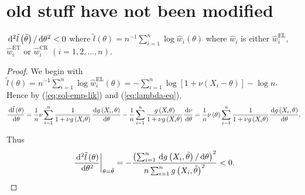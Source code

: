 \section{old stuff have not been modified}
\begin{lem}
\label{lem:bell-shape-el} %
\begin{comment}
need condition 
\end{comment}
$\,\mathrm{d}^{2}\tilde{l}\left(\tilde{\theta}\right)/\,\mathrm{d}\theta^{2}<0$
where $\tilde{l}\left(\theta\right)=n^{-1}\sum_{i=1}^{n}\log\hat{w}_{i}\left(\theta\right)$
where $\hat{w}_{i}$ is either $\hat{w}_{i}^{\mathrm{EL}}$, $\hat{w}_{i}^{\mathrm{ET}}$
or $\hat{w}_{i}^{\mathrm{CR}}$ $\left(i=1,2,\ldots,n\right)$.\end{lem}
\begin{proof}
We begin with $\tilde{l}\left(\theta\right)=n^{-1}\sum_{i=1}^{n}\log\hat{w}_{i}^{\mathrm{EL}}\left(\theta\right)=-\sum_{i=1}^{n}\log\left[1+\nu\left(X_{i}-\theta\right)\right]-\log n$.
Hence by (\ref{eq:sol-emp-lik}) and (\ref{eq:lambda-eq}), 
\[
\frac{\,\mathrm{d}\tilde{l}\left(\theta\right)}{\,\mathrm{d}\theta}=\frac{1}{n}\nu\sum_{i=1}^{n}\frac{1}{1+\nu g\left(X_{i}\theta\right)}\frac{\,\mathrm{d} g\left(X_{i},\theta\right)}{\,\mathrm{d}\theta}-\frac{1}{n}\sum_{i=1}^{n}\frac{g\left(X_{i}\theta\right)}{1+\nu g\left(X_{i}\theta\right)}\frac{\,\mathrm{d}\nu}{\,\mathrm{d}\theta}=\frac{1}{n}\nu\left(\theta\right)\sum_{i=1}^{n}\frac{1}{1+\nu g\left(X_{i}\theta\right)}\frac{\,\mathrm{d} g\left(X_{i},\theta\right)}{\,\mathrm{d}\theta}.
\]


Thus 
\[
\left.\frac{\,\mathrm{d}^{2}\tilde{l}\left(\theta\right)}{\,\mathrm{d}\theta^{2}}\right|_{\theta=\tilde{\theta}}=-\frac{\left(\sum_{i=1}^{n}\,\mathrm{d} g\left(X_{i},\tilde{\theta}\right)/\,\mathrm{d}\theta\right)^{2}}{n\sum_{i=1}^{n}g\left(X_{i},\tilde{\theta}\right)^{2}}<0.
\]



\end{proof}
